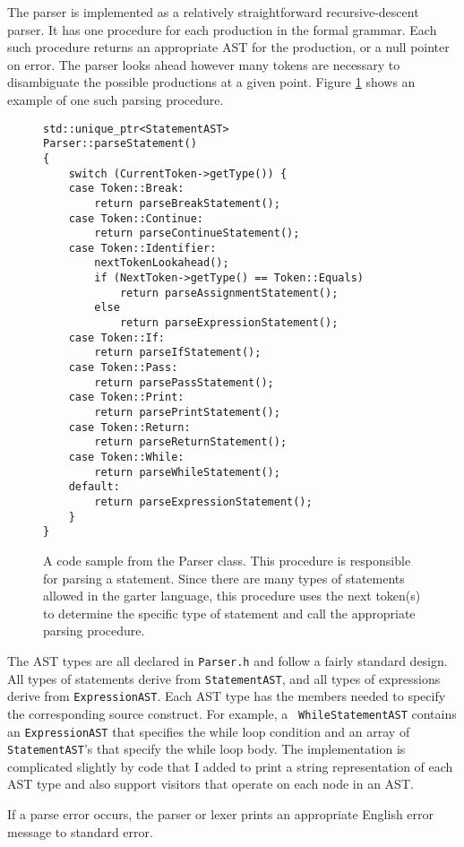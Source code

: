 \documentclass[11pt]{article}
\begin{document}
The parser is implemented as a relatively straightforward recursive-descent
parser.  It has one procedure for each production in the formal grammar.  Each
such procedure returns an appropriate AST for the production, or a null pointer
on error.  The parser looks ahead however many tokens are necessary to
disambiguate the possible productions at a given point.  Figure
\ref{fig:parseStatement} shows an example of one such parsing procedure.

\begin{figure}
\lstset{language=C++}
\begin{lstlisting}
std::unique_ptr<StatementAST>
Parser::parseStatement()
{
	switch (CurrentToken->getType()) {
	case Token::Break:
		return parseBreakStatement();
	case Token::Continue:
		return parseContinueStatement();
	case Token::Identifier:
		nextTokenLookahead();
		if (NextToken->getType() == Token::Equals)
			return parseAssignmentStatement();
		else
			return parseExpressionStatement();
	case Token::If:
		return parseIfStatement();
	case Token::Pass:
		return parsePassStatement();
	case Token::Print:
		return parsePrintStatement();
	case Token::Return:
		return parseReturnStatement();
	case Token::While:
		return parseWhileStatement();
	default:
		return parseExpressionStatement();
	}
}
\end{lstlisting}
\caption{A code sample from the Parser class.  This procedure is responsible for
parsing a statement.  Since there are many types of statements allowed in the
garter language, this procedure uses the next token(s) to determine the specific
type of statement and call the appropriate parsing procedure.  }
\label{fig:parseStatement}
\end{figure}

The AST types are all declared in {\tt Parser.h} and follow a fairly standard
design.  All types of statements derive from {\tt StatementAST}, and all types
of expressions derive from {\tt ExpressionAST}.  Each AST type has the members
needed to specify the corresponding source construct. For example, a {\tt
WhileStatementAST} contains an {\tt ExpressionAST} that specifies the while loop
condition and an array of {\tt StatementAST}'s that specify the while loop body.
The implementation is complicated slightly by code that I added to print a
string representation of each AST type and also support visitors that operate on each
node in an AST.

If a parse error occurs, the parser or lexer prints an appropriate English error
message to standard error.
\end{document}
